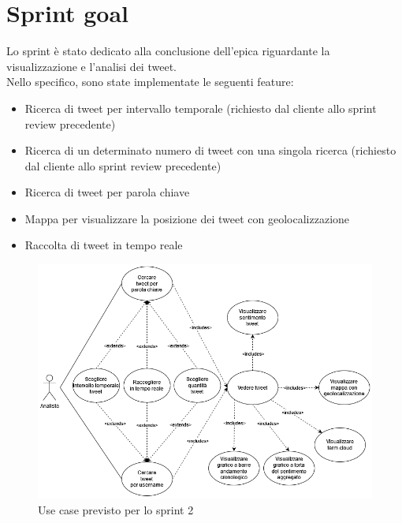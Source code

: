 \documentclass[11pt]{article}
\begin{document}
\section*{Sprint goal}
\justify
Lo sprint è stato dedicato alla conclusione dell'epica riguardante la visualizzazione e l'analisi dei tweet.\\
Nello specifico, sono state implementate le seguenti feature:
\begin{itemize}
    \item Ricerca di tweet per intervallo temporale (richiesto dal cliente allo sprint review precedente)
    \item Ricerca di un determinato numero di tweet con una singola ricerca (richiesto dal cliente allo sprint review precedente)
    \item Ricerca di tweet per parola chiave
    \item Mappa per visualizzare la posizione dei tweet con geolocalizzazione
    \item Raccolta di tweet in tempo reale
\end{itemize}


\begin{figure}[H]
    \centering
    \includegraphics[width=12cm]{./img/usecase.png}
    \caption{Use case previsto per lo sprint 2}
\end{figure}

\newpage
\end{document}
